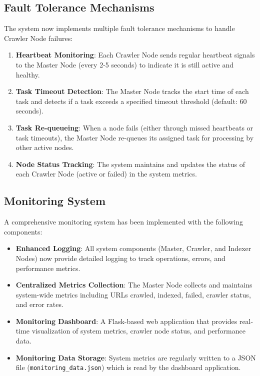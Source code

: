 \documentclass[12pt]{article}
\begin{document}
\subsection{Fault Tolerance Mechanisms}
The system now implements multiple fault tolerance mechanisms to handle Crawler Node failures:

\begin{enumerate}
    \item \textbf{Heartbeat Monitoring}: Each Crawler Node sends regular heartbeat signals to the Master Node (every 2-5 seconds) to indicate it is still active and healthy.
    \item \textbf{Task Timeout Detection}: The Master Node tracks the start time of each task and detects if a task exceeds a specified timeout threshold (default: 60 seconds).
    \item \textbf{Task Re-queueing}: When a node fails (either through missed heartbeats or task timeouts), the Master Node re-queues its assigned task for processing by other active nodes.
    \item \textbf{Node Status Tracking}: The system maintains and updates the status of each Crawler Node (active or failed) in the system metrics.
\end{enumerate}

\subsection{Monitoring System}
A comprehensive monitoring system has been implemented with the following components:

\begin{itemize}
    \item \textbf{Enhanced Logging}: All system components (Master, Crawler, and Indexer Nodes) now provide detailed logging to track operations, errors, and performance metrics.
    \item \textbf{Centralized Metrics Collection}: The Master Node collects and maintains system-wide metrics including URLs crawled, indexed, failed, crawler status, and error rates.
    \item \textbf{Monitoring Dashboard}: A Flask-based web application that provides real-time visualization of system metrics, crawler node status, and performance data.
    \item \textbf{Monitoring Data Storage}: System metrics are regularly written to a JSON file (\texttt{monitoring\_data.json}) which is read by the dashboard application.
\end{itemize}
\end{document}
